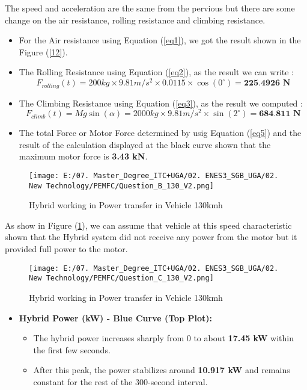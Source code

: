 \documentclass[12pt,a4paper]{article}
\numberwithin{equation}{section}
\begin{document}
{The speed and acceleration are the same from the pervious but there are some change on the air resistance, rolling resistance and climbing	resistance. 

\begin{itemize}
	\item For the Air resistance using Equation (\ref{eq1}), we got the result shown in the Figure (\ref{12}).
	\item The Rolling Resistance using Equation (\ref{eq2}), as the result we can write :
	\begin{equation}
		F_{rolling}(t) = 200kg\times9.81m/s^2\times0.0115\times \cos(0^\circ) = \textbf{225.4926 N}\label{eq13}
	\end{equation}
	\item The Climbing Resistance using Equation (\ref{eq3}), as the result we computed :
	\begin{equation}
		F_{climb}(t) = Mg\sin(\alpha) = 2000kg \times 9.81m/s^2 \times \sin(2^\circ) = \textbf{684.811 N} \label{eq14}
	\end{equation}
	\item The total Force or Motor Force determined by usig Equation (\ref{eq5}) and the result of the calculation displayed at the black curve shown that the maximum motor force is \textbf{3.43 kN}.
\end{itemize}


\begin{figure}[h]
	\centering 
	\texttt{[image: E:/07. Master\_Degree\_ITC+UGA/02. ENES3\_SGB\_UGA/02. New Technology/PEMFC/Question\_B\_130\_V2.png]}
	\caption{\small {Hybrid working in Power transfer in Vehicle 130kmh}}
	\label{13}
\end{figure}

As show in Figure (\ref{13}), we can assume that vehicle at this speed characteristic shown that the Hybrid system did not receive any power from the motor but it provided full power to the motor.

\begin{figure}[h]
	\centering 
	\texttt{[image: E:/07. Master\_Degree\_ITC+UGA/02. ENES3\_SGB\_UGA/02. New Technology/PEMFC/Question\_C\_130\_V2.png]}
	\caption{\small {Hybrid working in Power transfer in Vehicle 130kmh}}
	\label{14}
\end{figure}

\begin{itemize}
	\item \textbf{Hybrid Power (kW) - Blue Curve (Top Plot):}
	\begin{itemize}
		\item The hybrid power increases sharply from 0 to about \textbf{17.45 kW} within the first few seconds.
		\item After this peak, the power stabilizes around \textbf{10.917 kW} and remains constant for the rest of the 300-second interval.
	\end{itemize}
	

\end{itemize}}
\end{document}
